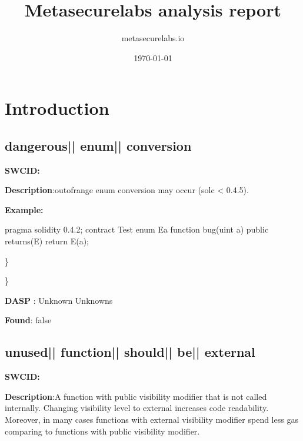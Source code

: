 \documentclass{article}
\title{Metasecurelabs analysis report}
\author{metasecurelabs.io }
\date{\today}
\begin{document}
 

\maketitle 

\section{Introduction} 
\subsection{dangerous{|\textunderscore| }enum{|\textunderscore| }conversion} 
\textbf{SWC{\textunderscore }ID:} 

\textbf{Description}:out{\textendash}of{\textendash}range enum conversion may occur (solc < 0.4.5).


\textbf{Example:} 
\begin{ffcode} 

pragma solidity 0.4.2;
contract Test{
  enum E{a}
  function bug(uint a) public returns(E){
        return E(a);
    }
}

\end{ffcode} 
\} 

\} 

\textbf{DASP} : Unknown Unknowns

\textbf{Found}: false

\subsection{unused{|\textunderscore| }function{|\textunderscore| }should{|\textunderscore| }be{|\textunderscore| }external} 
\textbf{SWC{\textunderscore }ID:} 

\textbf{Description}:A function with public visibility modifier that is not called internally. Changing visibility level to external increases code readability. Moreover, in many cases functions with external visibility modifier spend less gas comparing to functions with public visibility modifier.
\end{document}

